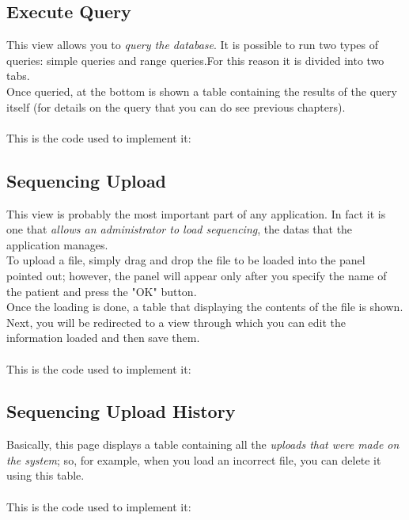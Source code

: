 


\subsection{Execute Query}

This view allows you to \emph{query the database}. It is possible to run two types of queries: simple queries and range queries.For this reason it is divided into two tabs. 
\\Once queried, at the bottom is shown a table containing the results of the query itself (for details on the query that you can do see previous chapters). 
\\
\\This is the code used to implement it: 




\subsection{Sequencing Upload}

This view is probably the most important part of any application. In fact it is one that \emph{allows an administrator to load sequencing}, the datas that the application manages. 
\\To upload a file, simply drag and drop the file to be loaded into the panel pointed out; however, the panel will appear only after you specify the name of the patient and press the "OK" button. 
\\Once the loading is done, a table that displaying the contents of the file is shown. Next, you will be redirected to a view through which you can edit the information loaded and then save them. 
\\
\\This is the code used to implement it: 




\subsection{Sequencing Upload History}

Basically, this page displays a table containing all the \emph{uploads that were made on the system}; so, for example, when you load an incorrect file, you can delete it using this table.
\\
\\This is the code used to implement it:


